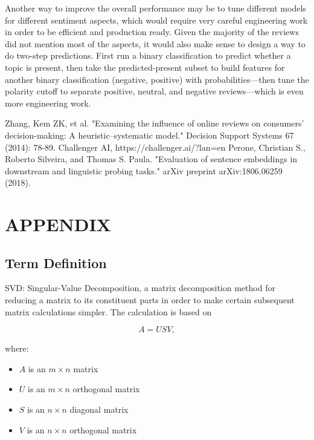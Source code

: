 \documentclass[compsoc]{IEEEtran}
\begin{document}
Another way to improve the overall performance may be to tune different models for different sentiment aspects, which would require very careful engineering work in order to be efficient and production ready. Given the majority of the reviews did not mention most of the aspects, it would also make sense to design a way to do two-step predictions. First run a binary classification to predict whether a topic is present, then take the predicted-present subset to build features for another binary classification (negative, positive) with probabilities---then tune the polarity cutoff to separate positive, neutral, and negative reviews---which is even more engineering work. 


\begin{thebibliography}{99}
 Zhang, Kem ZK, et al. "Examining the influence of online reviews on consumers' decision-making: A heuristic–systematic model." Decision Support Systems 67 (2014): 78-89.
 Challenger AI, https://challenger.ai/?lan=en
 Perone, Christian S., Roberto Silveira, and Thomas S. Paula. "Evaluation of sentence embeddings in downstream and linguistic probing tasks." arXiv preprint arXiv:1806.06259 (2018).

\end{thebibliography}



\newpage
\section*{APPENDIX}

\subsection*{Term Definition}

SVD: Singular-Value Decomposition, a matrix decomposition method for reducing a matrix to its constituent parts in order to make certain subsequent matrix calculations simpler. The calculation is based on

$$
A = USV,
$$

where:

\begin{itemize}
    \item $A$ is an $m \times n$ matrix
    \item $U$ is an $m \times n$ orthogonal matrix
    \item $S$ is an $n \times n$ diagonal matrix
    \item $V$ is an $n \times n$ orthogonal matrix
\end{itemize}
\end{document}
